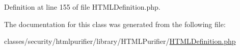 Definition at line 155 of file H\+T\+M\+L\+Definition.\+php.



The documentation for this class was generated from the following file\+:\begin{DoxyCompactItemize}
\item 
classes/security/htmlpurifier/library/\+H\+T\+M\+L\+Purifier/\hyperlink{HTMLDefinition_8php}{H\+T\+M\+L\+Definition.\+php}\end{DoxyCompactItemize}

